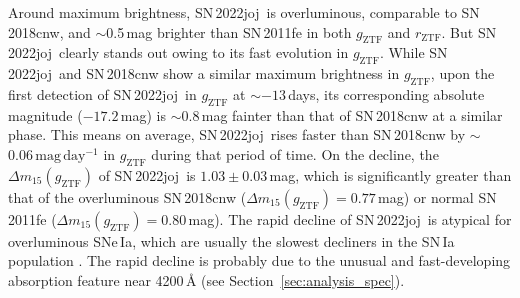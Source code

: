 \documentclass[twocolumn]{aastex631}
\newcommand{\sn}{SN\,2022joj}
\begin{document}
\begin{CJK*}{UTF8}{gbsn}
Around maximum brightness, \sn\ is overluminous, comparable to SN\,2018cnw, and $\sim$0.5\,mag brighter than SN\,2011fe in both $g_\mathrm{ZTF}$ and $r_\mathrm{ZTF}$. But \sn\ clearly stands out owing to its fast evolution in $g_\mathrm{ZTF}$. While \sn\ and SN\,2018cnw show a similar maximum brightness in $g_\mathrm{ZTF}$, upon the first detection of \sn\ in $g_\mathrm{ZTF}$ at $\sim$$-13$\,days, its corresponding absolute magnitude ($-17.2$\,mag) is $\sim$0.8\,mag fainter than that of SN\,2018cnw at a similar phase. This means on average, \sn\ rises faster than SN\,2018cnw by $\sim$$0.06\,\mathrm{mag\,day^{-1}}$ in $g_\mathrm{ZTF}$ during that period of time. On the decline, the $\Delta m_{15}(g_\mathrm{ZTF})$ of \sn\ is $1.03\pm0.03$\,mag, which is significantly greater than that of the overluminous SN\,2018cnw ($\Delta m_{15}(g_\mathrm{ZTF})=0.77$\,mag) or normal SN\,2011fe ($\Delta m_{15}(g_\mathrm{ZTF})=0.80$\,mag). The rapid decline of \sn\ is atypical for overluminous SNe\,Ia, which are usually the slowest decliners in the SN\,Ia population \citep{Phillips_1999, Taubenberger_2017}. The rapid decline is probably due to the unusual and fast-developing absorption feature near 4200\,\r{A} (see Section~\ref{sec:analysis_spec}).


\end{CJK*}
\end{document}
